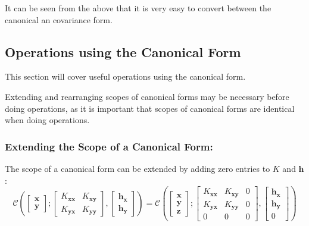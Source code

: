 \documentclass[12pt,oneside,openany,a4paper, %
afrikaans,english,
]{memoir}
\numberwithin{equation}{chapter}
\begin{document}
It can be seen from the above that it is very easy to convert between the canonical an covariance form. 
\subsection{Operations using the Canonical Form}
This section will cover useful operations using the canonical form. 

Extending and rearranging scopes of canonical forms may be necessary before doing operations, as it is important that scopes of canonical forms are identical when doing operations. 
\subsubsection{Extending the Scope of a Canonical Form:}
The scope of a canonical form can be extended by adding zero entries to $K$ and $\bm{h}$:
\begin{equation}
\mathcal{C}\left(
\begin{bmatrix}
\bm{x}\\
\bm{y}
\end{bmatrix};
\begin{bmatrix}
K_{\bm{xx}} & K_{\bm{xy}}\\
K_{\bm{yx}} & K_{\bm{yy}}
\end{bmatrix},
\begin{bmatrix}
\bm{h_x}\\
\bm{h_y}
\end{bmatrix}
\right)
=
\mathcal{C}\left(
\begin{bmatrix}
\bm{x}\\
\bm{y}\\
\bm{z}
\end{bmatrix};
\begin{bmatrix}
K_{\bm{xx}} & K_{\bm{xy}} & \textit{0}\\
K_{\bm{yx}} & K_{\bm{yy}} & \textit{0}\\
\textit{0} & \textit{0} & \textit{0}
\end{bmatrix},
\begin{bmatrix}
\bm{h_x}\\
\bm{h_y}\\
\textit{0}
\end{bmatrix}
\right)
\end{equation}
\end{document}
